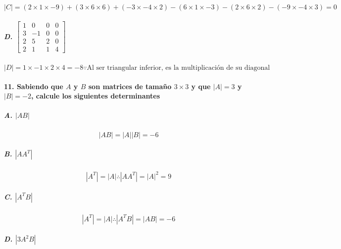 \documentclass[
]{article}
\begin{document}
\[
|C| = (2\times1\times-9) + (3\times6\times6) + (-3\times-4\times2) - (6\times1\times-3) - (2\times6\times2) - (-9\times-4\times3) = 0
\]

\hypertarget{d.-beginbmatrix10003-10025202114endbmatrix}{%
\subparagraph{\texorpdfstring{D.
\(\begin{bmatrix}1&0&0&0\\3&-1&0&0\\2&5&2&0\\2&1&1&4\end{bmatrix}\)}{D. \textbackslash begin\{bmatrix\}1\&0\&0\&0\textbackslash\textbackslash3\&-1\&0\&0\textbackslash\textbackslash2\&5\&2\&0\textbackslash\textbackslash2\&1\&1\&4\textbackslash end\{bmatrix\}}}\label{d.-beginbmatrix10003-10025202114endbmatrix}}

\[
|D| = 1\times-1\times2\times4 = -8 \because \text{Al ser triangular inferior, es la multiplicación de su diagonal}
\]

\hypertarget{sabiendo-que-a-y-b-son-matrices-de-tamauxf1o-3times3-y-que-a-3-y-b--2-calcule-los-siguientes-determinantes}{%
\paragraph{\texorpdfstring{11. Sabiendo que \(A\) y \(B\) son matrices
de tamaño \(3\times3\) y que \(|A| = 3\) y \(|B| = -2\), calcule los
siguientes
determinantes}{11. Sabiendo que A y B son matrices de tamaño 3\textbackslash times3 y que \textbar A\textbar{} = 3 y \textbar B\textbar{} = -2, calcule los siguientes determinantes}}\label{sabiendo-que-a-y-b-son-matrices-de-tamauxf1o-3times3-y-que-a-3-y-b--2-calcule-los-siguientes-determinantes}}

\hypertarget{a.-ab}{%
\subparagraph{\texorpdfstring{A.
\(|AB|\)}{A. \textbar AB\textbar{}}}\label{a.-ab}}

\[
|AB| = |A||B| = -6
\]

\hypertarget{b.-aat}{%
\subparagraph{\texorpdfstring{B.
\(|AA^T|\)}{B. \textbar AA\^{}T\textbar{}}}\label{b.-aat}}

\[
|A^T| = |A| \therefore |AA^T| = |A|^2 = 9
\]

\hypertarget{c.-atb}{%
\subparagraph{\texorpdfstring{C.
\(|A^TB|\)}{C. \textbar A\^{}TB\textbar{}}}\label{c.-atb}}

\[
|A^T| = |A| \therefore |A^TB| = |AB| = -6
\]

\hypertarget{d.-3a2b}{%
\subparagraph{\texorpdfstring{D.
\(|3A^2B|\)}{D. \textbar3A\^{}2B\textbar{}}}\label{d.-3a2b}}
\end{document}
